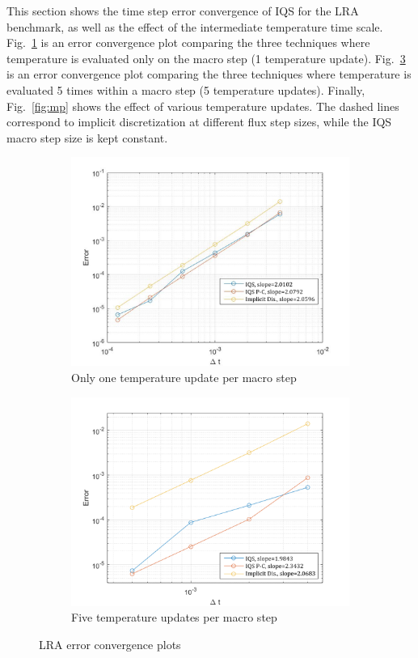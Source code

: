 \documentclass{elsarticle}
\newcommand{\fig}[1]{Fig.~\ref{#1}}                      %
\begin{document}
This section shows the time step error convergence of IQS for the LRA benchmark, as well as the effect of the intermediate temperature time scale. \fig{fig:lra_bad} is an error convergence plot comparing the three techniques where temperature is evaluated only on the macro step (1 temperature update).  \fig{fig:lra_mpconv} is an error convergence plot comparing the three techniques where temperature is evaluated 5 times within a macro step (5 temperature updates).  Finally, \fig{fig:mp} shows the effect of various temperature updates. The dashed lines correspond to implicit discretization at different flux step sizes, while the IQS macro step size is kept constant.

\begin{figure}[!htbp]
\centering
\begin{subfigure}[!htbp]{0.49\textwidth}
\includegraphics[width=\textwidth]{figures/lra_bad.png}
\caption{Only one temperature update per macro step}
\label{fig:lra_bad}
\end{subfigure}
\begin{subfigure}[!htbp]{0.49\textwidth}
\includegraphics[width=\textwidth]{figures/lra_mp_convergence.png}
\caption{Five temperature updates per macro step}
\label{fig:lra_mpconv}
\end{subfigure}
\caption{LRA error convergence plots}
\end{figure}
\end{document}

